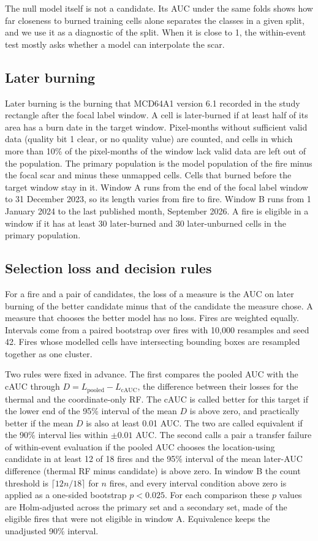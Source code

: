 \documentclass[preprint,12pt,authoryear]{elsarticle}
\begin{document}
The null model itself is not a candidate. Its AUC under the same folds shows how far closeness to burned training cells alone separates the classes in a given split, and we use it as a diagnostic of the split. When it is close to 1, the within-event test mostly asks whether a model can interpolate the scar.

\subsection{Later burning}
\label{sec:later}

Later burning is the burning that MCD64A1 version 6.1 recorded in the study rectangle after the focal label window. A cell is later-burned if at least half of its area has a burn date in the target window. Pixel-months without sufficient valid data (quality bit 1 clear, or no quality value) are counted, and cells in which more than 10\% of the pixel-months of the window lack valid data are left out of the population. The primary population is the model population of the fire minus the focal scar and minus these unmapped cells. Cells that burned before the target window stay in it. Window A runs from the end of the focal label window to 31 December 2023, so its length varies from fire to fire. Window B runs from 1 January 2024 to the last published month, September 2026. A fire is eligible in a window if it has at least 30 later-burned and 30 later-unburned cells in the primary population.

\subsection{Selection loss and decision rules}
\label{sec:loss}

For a fire and a pair of candidates, the loss of a measure is the AUC on later burning of the better candidate minus that of the candidate the measure chose. A measure that chooses the better model has no loss. Fires are weighted equally. Intervals come from a paired bootstrap over fires with 10,000 resamples and seed 42. Fires whose modelled cells have intersecting bounding boxes are resampled together as one cluster.

Two rules were fixed in advance. The first compares the pooled AUC with the cAUC through $D = L_\mathrm{pooled} - L_\mathrm{cAUC}$, the difference between their losses for the thermal and the coordinate-only RF. The cAUC is called better for this target if the lower end of the 95\% interval of the mean $D$ is above zero, and practically better if the mean $D$ is also at least 0.01 AUC. The two are called equivalent if the 90\% interval lies within $\pm 0.01$ AUC. The second calls a pair a transfer failure of within-event evaluation if the pooled AUC chooses the location-using candidate in at least 12 of 18 fires and the 95\% interval of the mean later-AUC difference (thermal RF minus candidate) is above zero. In window B the count threshold is $\lceil 12n/18 \rceil$ for $n$ fires, and every interval condition above zero is applied as a one-sided bootstrap $p < 0.025$. For each comparison these $p$ values are Holm-adjusted across the primary set and a secondary set, made of the eligible fires that were not eligible in window A. Equivalence keeps the unadjusted 90\% interval.
\end{document}
